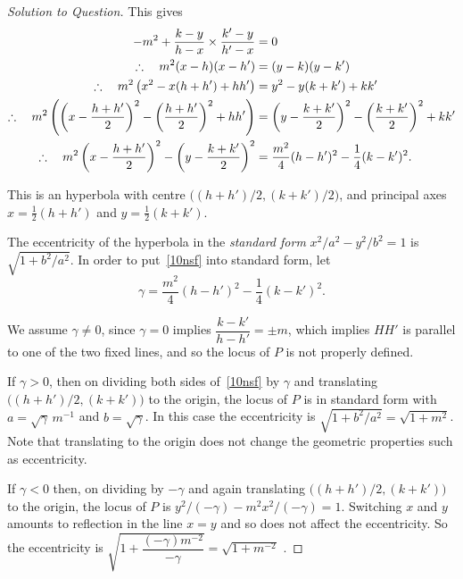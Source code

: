 \documentclass[11pt,a4paper]{report}
\theoremstyle{plain}
\theoremstyle{definition}
\begin{document}
\begin{proof}[Solution to Question]
This gives  
\begin{align} 
-m^2  +  \frac{k-y} {h-x} \times \frac{k'-y} {h'-x} &= 0 \notag\\
\therefore \quad m^2(x-h)(x-h') &= (y-k)(y-k')  \notag \\
\therefore \quad m^2\left( x^2 - x(h+h') + hh' \right) &=   y^2 - y(k+k') + kk'    \notag \\
\therefore \quad  m^2\left( \left( x - \frac{h+h'} {2} \right)^2  - \left( \frac{h+h'} {2} \right)^2 + hh' \right) 
			      &=    \left( y - \frac{k+k'} {2} \right)^2  - \left( \frac{k+k'} {2} \right)^2 + kk'   \notag \\
\therefore \quad m^2  \left( x - \frac{h+h'} {2} \right)^2 -    \left( y - \frac{k+k'} {2} \right)^2 &=
						\frac{m^2}{4} (h - h')^2 - \frac{1}{4} (k-  k')^2 \label{10nsf}.				
\end{align} 

This is an hyperbola with centre $ \big( (h + h')/2, (k+k')/2 \big) $, and principal axes $ x = \frac{1}{2} (h+h') $ and $ y =  \frac{1}{2} (k+k')   $.

\medskip
The eccentricity of the hyperbola in  the \emph{standard form} $ x^2/a^2 - y^2/b^2 = 1 $ is $ \sqrt{1 + b^2/a^2 } $.
In order to put~\eqref{10nsf} into standard form, let 
\[
\gamma = \frac{m^2}{4} (h - h')^2 - \frac{1}{4} (k-  k')^2  .
\]

We   assume $ \gamma \neq 0 $, since $ \gamma = 0$ implies  $ \dfrac{k-k'}{h-h'} = \pm m $, which   implies $ HH' $ is parallel to one of the two fixed lines, and so the locus of $ P $ is not properly defined.

If $ \gamma > 0 $, then on dividing both sides of~\eqref{10nsf} by $ \gamma $ and translating $\big((h+h')/2, (k+k')\big) $ to the origin, the locus of $ P $ is in standard form with $ a= \sqrt{\gamma}\, m^{-1} $ and $ b  = \sqrt{ \gamma } $. In this case the eccentricity is $ \sqrt{1 + b^2/a^2} = \sqrt{1+m^2 } $. Note that translating to the origin does not change the geometric properties such as eccentricity.

If $ \gamma < 0 $ then, on dividing  by $ - \gamma $ and again translating $\big((h+h')/2, (k+k')\big) $ to the origin, the locus of $ P $ is 
$ y^2/(- \gamma ) - m^2x^2/(- \gamma ) = 1 $.  Switching $ x $ and $ y $  amounts to reflection in the line $ x=y $ and so does not affect the eccentricity.  So the eccentricity is $ \sqrt{1 + \dfrac{(- \gamma ) m^{-2}}{- \gamma } } = \sqrt{1+ m^{-2} }$ .




\end{proof}
\end{document}
